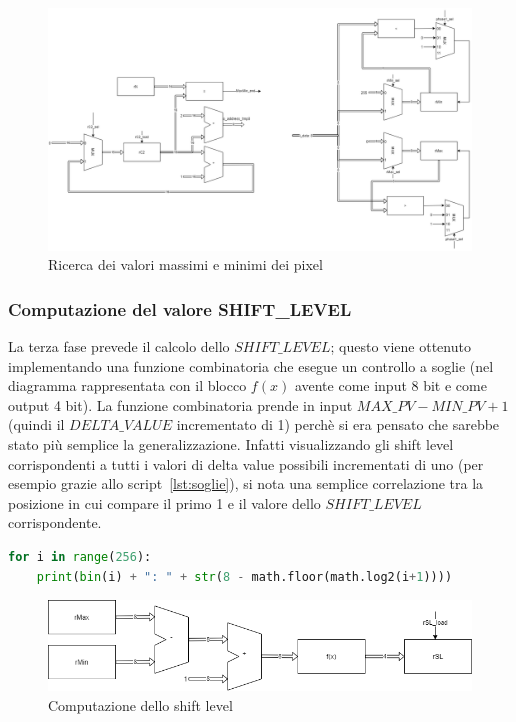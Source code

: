\documentclass[11pt]{article} %
\begin{document}
\begin{figure}[h]
\centering
\includegraphics[width=120mm]{datapaths/regMax_regMin.png}
\caption{Ricerca dei valori massimi e minimi dei pixel}
\end{figure}


\subsubsection{Computazione del valore SHIFT\_LEVEL}
La terza fase prevede il calcolo dello $SHIFT\_LEVEL$; questo viene ottenuto implementando una funzione combinatoria che esegue un controllo a soglie (nel diagramma rappresentata con il blocco $f(x)$ avente come input 8 bit e come output 4 bit). La funzione combinatoria prende in input $MAX\_PV - MIN\_PV + 1$ (quindi il $DELTA\_VALUE$ incrementato di 1) perchè si era pensato che sarebbe stato più semplice la generalizzazione. Infatti visualizzando gli shift level corrispondenti a tutti i valori di delta value possibili incrementati di uno (per esempio grazie allo script~\ref{lst:soglie}), si nota una semplice correlazione tra la posizione in cui compare il primo 1 e il valore dello $SHIFT\_LEVEL$ corrispondente.

\begin{lstlisting}[language=Python, caption=Generazione di soglie, label={lst:soglie}]
for i in range(256):
	print(bin(i) + ": " + str(8 - math.floor(math.log2(i+1))))
\end{lstlisting}

\begin{figure}[h]
\centering
\includegraphics[width=120mm]{datapaths/regSL_final.png}
\caption{Computazione dello shift level}
\end{figure}
\end{document}
